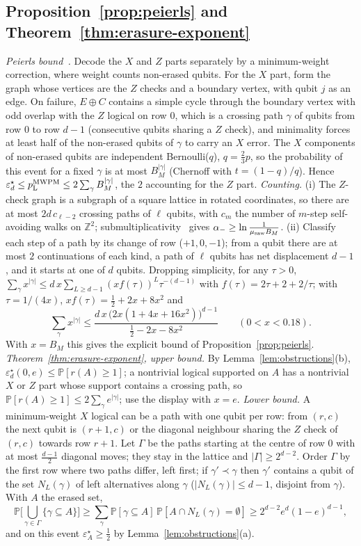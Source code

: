 \documentclass[11pt,a4paper]{article}
\theoremstyle{plain}
\theoremstyle{definition}
\theoremstyle{remark}
\newcommand{\Prob}{\mathbb{P}}
\newcommand{\err}{\varepsilon^{\star}}
\newcommand{\pL}{p_{\mathrm{L}}}
\begin{document}
\subsection{Proposition~\ref{prop:peierls} and Theorem~\ref{thm:erasure-exponent}}
\emph{Peierls bound~\cite{DKLP}.} Decode the $X$ and $Z$ parts separately by a minimum-weight correction, where weight counts non-erased qubits. For the $X$ part, form the graph whose vertices are the $Z$ checks and a boundary vertex, with qubit $j$ as an edge. On failure, $E\oplus C$ contains a simple cycle through the boundary vertex with odd overlap with the $Z$ logical on row $0$, which is a crossing path $\gamma$ of qubits from row $0$ to row $d-1$ (consecutive qubits sharing a $Z$ check), and minimality forces at least half of the non-erased qubits of $\gamma$ to carry an $X$ error. The $X$ components of non-erased qubits are independent Bernoulli($q$), $q=\tfrac23p$, so the probability of this event for a fixed $\gamma$ is at most $B_M^{|\gamma|}$ (Chernoff with $t=(1-q)/q$). Hence $\err_d\le\pL^{\rm MWPM}\le2\sum_\gamma B_M^{|\gamma|}$, the $2$ accounting for the $Z$ part.
\emph{Counting.} (i) The $Z$-check graph is a subgraph of a square lattice in rotated coordinates, so there are at most $2d\,c_{\ell-2}$ crossing paths of $\ell$ qubits, with $c_m$ the number of $m$-step self-avoiding walks on $\mathbb Z^2$; submultiplicativity~\cite{MS} gives $\alpha_-\ge\ln\frac1{\mu_{\rm saw}B_M}$. (ii) Classify each step of a path by its change of row ($+1,0,-1$); from a qubit there are at most $2$ continuations of each kind, a path of $\ell$ qubits has net displacement $d-1$, and it starts at one of $d$ qubits. Dropping simplicity, for any $\tau>0$, $\sum_\gamma x^{|\gamma|}\le d\,x\sum_{L\ge d-1}(xf(\tau))^L\tau^{-(d-1)}$ with $f(\tau)=2\tau+2+2/\tau$; with $\tau=1/(4x)$, $xf(\tau)=\tfrac12+2x+8x^2$ and
\[
\sum_\gamma x^{|\gamma|}\le\frac{d\,x\,\big(2x(1+4x+16x^2)\big)^{d-1}}{\tfrac12-2x-8x^2}\qquad(0<x<0.18).
\]
With $x=B_M$ this gives the explicit bound of Proposition~\ref{prop:peierls}.
\emph{Theorem~\ref{thm:erasure-exponent}, upper bound.} By Lemma~\ref{lem:obstructions}(b), $\err_d(0,e)\le\Prob[r(A)\ge1]$; a nontrivial logical supported on $A$ has a nontrivial $X$ or $Z$ part whose support contains a crossing path, so $\Prob[r(A)\ge1]\le2\sum_\gamma e^{|\gamma|}$; use the display with $x=e$.
\emph{Lower bound.} A minimum-weight $X$ logical can be a path with one qubit per row: from $(r,c)$ the next qubit is $(r+1,c)$ or the diagonal neighbour sharing the $Z$ check of $(r,c)$ towards row $r+1$. Let $\Gamma$ be the paths starting at the centre of row $0$ with at most $\frac{d-1}2$ diagonal moves; they stay in the lattice and $|\Gamma|\ge2^{d-2}$. Order $\Gamma$ by the first row where two paths differ, left first; if $\gamma'\prec\gamma$ then $\gamma'$ contains a qubit of the set $N_L(\gamma)$ of left alternatives along $\gamma$ ($|N_L(\gamma)|\le d-1$, disjoint from $\gamma$). With $A$ the erased set,
\[
\Prob\Big[\bigcup_{\gamma\in\Gamma}\{\gamma\subseteq A\}\Big]\ge\sum_\gamma\Prob[\gamma\subseteq A]\,\Prob[A\cap N_L(\gamma)=\emptyset]\ge2^{d-2}e^d(1-e)^{d-1},
\]
and on this event $\err_A\ge\tfrac12$ by Lemma~\ref{lem:obstructions}(a).
\end{document}

